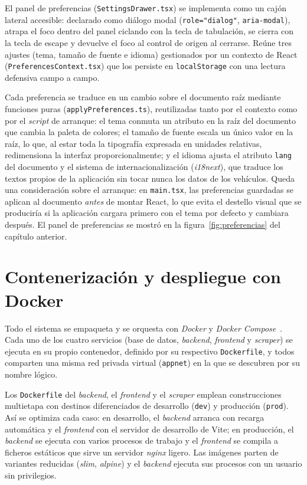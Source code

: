 El panel de preferencias (\texttt{SettingsDrawer.tsx}) se implementa como un cajón
lateral accesible: declarado como diálogo modal (\texttt{role="dialog"},
\texttt{aria-modal}), atrapa el foco dentro del panel ciclando con la tecla de
tabulación, se cierra con la tecla de escape y devuelve el foco al control de origen
al cerrarse. Reúne tres ajustes (tema, tamaño de fuente e idioma) gestionados por un
contexto de React (\texttt{PreferencesContext.tsx}) que los persiste en
\texttt{localStorage} con una lectura defensiva campo a campo.

Cada preferencia se traduce en un cambio sobre el documento raíz mediante funciones
puras (\texttt{applyPreferences.ts}), reutilizadas tanto por el contexto como por el
\emph{script} de arranque: el tema conmuta un atributo en la raíz del documento que
cambia la paleta de colores; el tamaño de fuente escala un único valor en la raíz,
lo que, al estar toda la tipografía expresada en unidades relativas, redimensiona la
interfaz proporcionalmente; y el idioma ajusta el atributo \texttt{lang} del
documento y el sistema de internacionalización (\emph{i18next}), que traduce los
textos propios de la aplicación sin tocar nunca los datos de los vehículos. Queda
una consideración sobre el arranque: en \texttt{main.tsx}, las preferencias
guardadas se aplican al documento \emph{antes} de montar React, lo que evita el
destello visual que se produciría si la aplicación cargara primero con el tema por
defecto y cambiara después. El panel de preferencias se mostró en la
figura~\ref{fig:preferencias} del capítulo anterior.

\section{Contenerización y despliegue con Docker}
\label{sec:impl-docker}

Todo el sistema se empaqueta y se orquesta con \emph{Docker} y \emph{Docker
Compose}~\cite{docker2024}. Cada uno de los cuatro servicios (base de datos, \emph{backend},
\emph{frontend} y \emph{scraper}) se ejecuta en su propio contenedor, definido por
su respectivo \texttt{Dockerfile}, y todos comparten una misma red privada virtual
(\texttt{appnet}) en la que se descubren por su nombre lógico.

Los \texttt{Dockerfile} del \emph{backend}, el \emph{frontend} y el \emph{scraper}
emplean construcciones multietapa con destinos diferenciados de desarrollo
(\texttt{dev}) y producción (\texttt{prod}). Así se optimiza cada caso: en
desarrollo, el \emph{backend} arranca con recarga automática y el \emph{frontend}
con el servidor de desarrollo de Vite; en producción, el \emph{backend} se ejecuta
con varios procesos de trabajo y el \emph{frontend} se compila a ficheros estáticos
que sirve un servidor \emph{nginx} ligero. Las imágenes parten de variantes
reducidas (\emph{slim}, \emph{alpine}) y el \emph{backend} ejecuta sus procesos con
un usuario sin privilegios.

